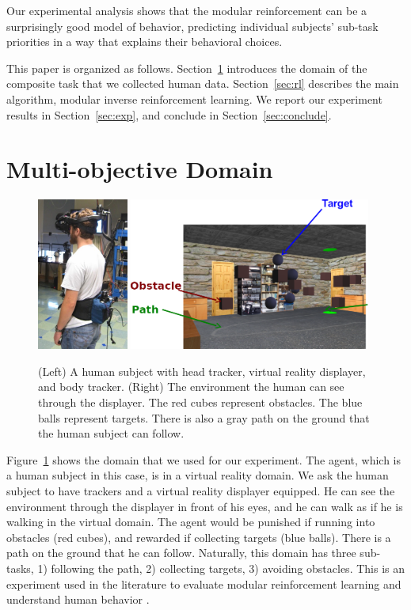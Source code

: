 \documentclass[11pt]{article} %
\begin{document}
Our experimental analysis shows that the modular reinforcement can be a 
surprisingly good model of behavior, predicting individual subjects' sub-task 
priorities in a way that explains their behavioral choices.

This paper is organized as follows. Section~\ref{sec:domain} introduces the
domain of the composite task that we collected human data. Section~\ref{sec:rl}
describes the main algorithm, modular inverse reinforcement learning. We report
our experiment results in Section~\ref{sec:exp}, and conclude in
Section~\ref{sec:conclude}.

\section{Multi-objective Domain}
\label{sec:domain}

\begin{figure}[h!]
\centering
\includegraphics[height=5cm]{human.jpg}
\includegraphics[height=5cm]{env.png}
\caption{(Left) A human subject with head tracker, virtual reality displayer, and
body tracker.  (Right) The environment the human can see through the displayer.
The red cubes represent obstacles. The blue balls represent targets. There is
also a gray path on the ground that the human subject can follow.}
\label{fig:avatar}
\end{figure}

Figure~\ref{fig:avatar} shows the domain that we used for our experiment. The
agent, which is a human subject in this case, is in a virtual reality domain.
We ask the human subject to have trackers and a virtual reality displayer
equipped. He can see the environment through the displayer in front of his eyes,
and he can walk as if he is walking in the virtual domain.
The agent would be punished if running into obstacles (red cubes), and rewarded
if collecting targets (blue balls). There is a path on the ground that he can
follow.
Naturally, this domain has three sub-tasks, 1) following the path, 2)
collecting targets, 3) avoiding obstacles.
This is an experiment used in the literature to evaluate modular reinforcement
learning \cite{rothkopf2013modular} and understand human behavior \cite{Tong2014}.
\end{document}
